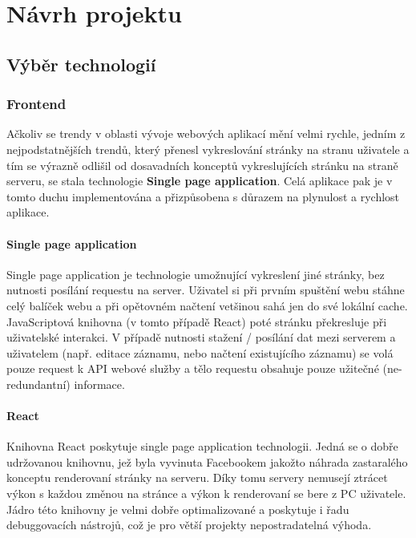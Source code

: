 \chapter{Návrh projektu}

\section{Výběr technologií}

\subsection{Frontend}
Ačkoliv se trendy v oblasti vývoje webových aplikací mění velmi rychle,
jedním z nejpodstatnějších trendů, který přenesl vykreslování stránky
na stranu uživatele a tím se výrazně odlišil od dosavadních konceptů
vykreslujících stránku na straně serveru, se stala technologie
\textbf{Single page application}. Celá aplikace pak je v tomto duchu
implementována a přizpůsobena s důrazem na plynulost a rychlost aplikace.

\subsubsection{Single page application}
Single page application je technologie umožnující vykreslení jiné stránky,
bez nutnosti posílání requestu na server.
Uživatel si při prvním spuštění webu stáhne celý balíček webu a 
při opětovném načtení vetšinou sahá jen do své lokální cache.
JavaScriptová knihovna (v tomto případě React)
poté stránku překresluje při uživatelské interakci.
V případě nutnosti stažení / posílání dat mezi serverem a uživatelem
(např. editace záznamu, nebo načtení existujícího záznamu)
se volá pouze request k API webové služby a tělo requestu obsahuje pouze
užitečné (ne-redundantní) informace. 


\subsubsection{React}
Knihovna React poskytuje single page application technologii.
Jedná se o dobře udržovanou knihovnu, jež byla vyvinuta Facebookem 
jakožto náhrada zastaralého konceptu renderovaní stránky na serveru.
Díky tomu servery nemusejí ztrácet výkon s každou změnou na stránce a
výkon k renderovaní se bere z PC uživatele.
Jádro této knihovny je velmi dobře optimalizované a poskytuje i řadu
debuggovacích nástrojů, což je pro větší projekty nepostradatelná výhoda.  


